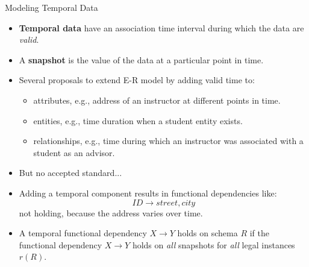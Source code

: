 \documentclass{beamer}
\begin{document}
\begin{frame}{Modeling Temporal Data}
    \footnotesize
    \begin{itemize}
        \item \textbf{Temporal data} have an association time interval during which the data are \textit{valid}.
        \item A \textbf{snapshot} is the value of the data at a particular point in time.
        \item Several proposals to extend E-R model by adding valid time to:
            \begin{itemize}
                \footnotesize
                \item attributes, e.g., address of an instructor at different points in time.
                \item entities, e.g., time duration when a student entity exists.
                \item relationships, e.g., time during which an instructor was associated with a student as an advisor.
            \end{itemize}
        \item But no accepted standard...
        \item Adding a temporal component results in functional dependencies like:
            $$
                ID \rightarrow street, city
            $$
            not holding, because the address varies over time.
        \item A temporal functional dependency $X \rightarrow Y$ holds on schema $R$ if the functional dependency $X \longrightarrow Y$ holds on \textit{all} snapshots for \textit{all} legal instances $r(R)$.
    \end{itemize}
\end{frame}
\end{document}
